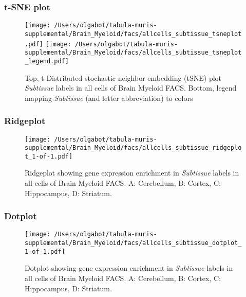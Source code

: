 \clearpage
\subsubsection{t-SNE plot}
\begin{figure}[h]
\centering
\texttt{[image: /Users/olgabot/tabula-muris-supplemental/Brain\_Myeloid/facs/allcells\_subtissue\_tsneplot.pdf]}
\texttt{[image: /Users/olgabot/tabula-muris-supplemental/Brain\_Myeloid/facs/allcells\_subtissue\_tsneplot\_legend.pdf]}
\caption{Top, t-Distributed stochastic neighbor embedding (tSNE) plot  \emph{Subtissue} labels in all cells of Brain Myeloid FACS. Bottom, legend mapping \emph{Subtissue} (and letter abbreviation) to colors}
\end{figure}


\clearpage

\subsubsection{Ridgeplot}
\begin{figure}[h]
\centering
\texttt{[image: /Users/olgabot/tabula-muris-supplemental/Brain\_Myeloid/facs/allcells\_subtissue\_ridgeplot\_1-of-1.pdf]}

\caption{ Ridgeplot  showing gene expression enrichment in \emph{Subtissue} labels in all cells of Brain Myeloid FACS. A: Cerebellum, B: Cortex, C: Hippocampus, D: Striatum.}
\end{figure}


\clearpage

\subsubsection{Dotplot}
\begin{figure}[h]
\centering
\texttt{[image: /Users/olgabot/tabula-muris-supplemental/Brain\_Myeloid/facs/allcells\_subtissue\_dotplot\_1-of-1.pdf]}

\caption{ Dotplot  showing gene expression enrichment in \emph{Subtissue} labels in all cells of Brain Myeloid FACS. A: Cerebellum, B: Cortex, C: Hippocampus, D: Striatum.}
\end{figure}

